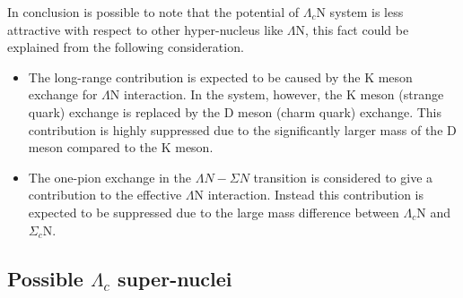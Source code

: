 \documentclass[12pt,a4paper]{book}
\begin{document}
	In conclusion is possible to note that the potential of $\Lambda_c$N system is less attractive with respect to other hyper-nucleus like $\Lambda$N, this fact could be explained from the following consideration. 
	\begin{itemize}
		\item The long-range contribution is expected to be caused by the K meson exchange for $\Lambda$N interaction. In the system, however, the K meson (strange quark) exchange is replaced by the D meson (charm quark) exchange. This contribution is highly suppressed due to the significantly larger mass of the D meson compared to the K meson.
		\item The one-pion exchange in the $\Lambda N - \Sigma N$ transition is considered to give a contribution to the effective $\Lambda$N interaction. Instead this contribution is expected to be suppressed due to the large mass difference between $\Lambda_c$N and $\Sigma_c$N.
		
	\end{itemize}  
	
	\subsection{Possible $\Lambda_c$ super-nuclei}
	
\end{document}
